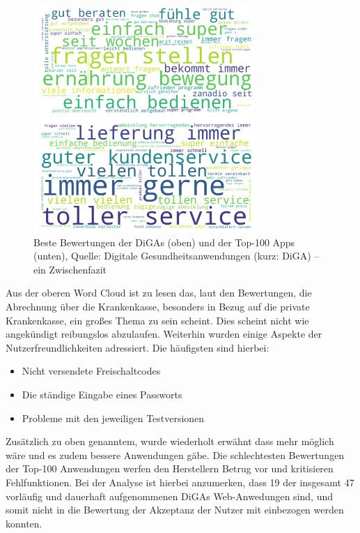 \documentclass{article}
\begin{document}
			\begin{figure}[htbp]
				\centering
				\includegraphics[width=0.75\textwidth]{./grafiken/word_cloud}
				\caption[Wordcloud von DiGAs und Top-100 Anwendungen]{Beste Bewertungen der DiGAs (oben) und der Top-100 Apps (unten), Quelle: Digitale Gesundheitsanwendungen (kurz: DiGA) – ein Zwischenfazit \cite{frauenhofinstitut}}
				\label{Abb-word-cloud}
			\end{figure}   
			Aus der oberen Word Cloud ist zu lesen das, laut den Bewertungen, die Abrechnung über die Krankenkasse, besonders in Bezug auf die private Krankenkasse, ein großes Thema zu sein scheint. Dies scheint nicht wie angekündigt reibungslos abzulaufen. Weiterhin wurden einige Aspekte der Nutzerfreundlichkeiten adressiert. Die häufigsten sind hierbei:
			\begin{itemize}
				\item Nicht versendete Freischaltcodes
				\item Die ständige Eingabe eines Passworts
				\item Probleme mit den jeweiligen Testversionen 
			\end{itemize} 
			Zusätzlich zu oben genanntem, wurde wiederholt erwähnt dass mehr möglich wäre und es zudem bessere Anwendungen gäbe. Die schlechtesten Bewertungen der Top-100 Anwendungen werfen den Herstellern Betrug vor und kritisieren Fehlfunktionen. Bei der Analyse ist hierbei anzumerken, dass 19 der insgesamt 47 vorläufig und dauerhaft aufgenommenen DiGAs Web-Anwedungen sind, und somit nicht in die Bewertung der Akzeptanz der Nutzer mit einbezogen werden konnten.\par
\end{document}
